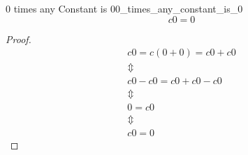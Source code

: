 \begin{proposition}{0 times any Constant is 0}{0_times_any_constant_is_0}
\[
c 0 = 0
\]
\end{proposition}
\begin{proof}
\begin{gather*}
    c0 = c \left( 0 +  0 \right) =  c0 +  c0\\
    \Updownarrow \\
    c0 -  c0 =  c0 +  c0 -  c0\\
    \Updownarrow \\
    0 =  c0\\
    \Updownarrow \\
    c0 = 0
\end{gather*}
\end{proof}
